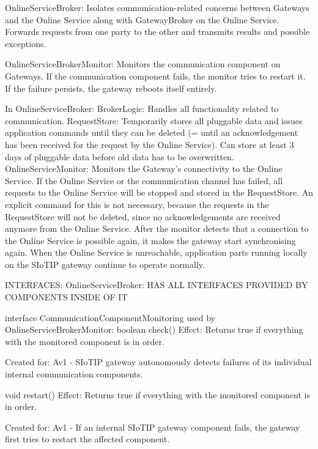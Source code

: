         OnlineServiceBroker: Isolates communication-related concerns between Gateways and the Online Service along with GatewayBroker on the Online Service.
                             Forwards requests from one party to the other and transmits results and possible exceptions.

        OnlineServiceBrokerMonitor: Monitors the communication component on Gateways. If the communication component fails, the monitor
                                    tries to restart it. If the failure persists, the gateway reboots itself entirely.

        In OnlineServiceBroker:
            BrokerLogic: Handles all functionality related to communication.
            RequestStore: Temporarily stores all pluggable data and issues application commands until they can be deleted (= until an acknowledgement has been received for the request by the Online Service). Can store at least 3 days of pluggable data before old data has to be overwritten.
            OnlineServiceMonitor: Monitors the Gateway's connectivity to the Online Service. If the Online Service or the communication channel has failed, all requests to the Online Service will be stopped and stored in the RequestStore. An explicit command for this is not necessary,
                                  because the requests in the RequestStore will not be deleted, since no acknowledgements are received anymore from the Online Service. After the monitor detects that a connection to the Online Service is possible again, it makes the gateway start
                                  synchronising again. When the Online Service is unreachable, application parts running locally on the SIoTIP gateway continue to operate normally.

        INTERFACES:
            OnlineServiceBroker:
                HAS ALL INTERFACES PROVIDED BY COMPONENTS INSIDE OF IT

                interface CommunicationComponentMonitoring used by OnlineServiceBrokerMonitor:
                    boolean check()
                        Effect: Returns true if everything with the monitored component is in order.
                        \item Created for: Av1 - SIoTIP gateway autonomously detects failures of its individual internal communication components.

                    void restart()
                        Effect: Returns true if everything with the monitored component is in order.
                        \item Created for: Av1 - If an internal SIoTIP gateway component fails, the gateway first tries to restart the affected component.

